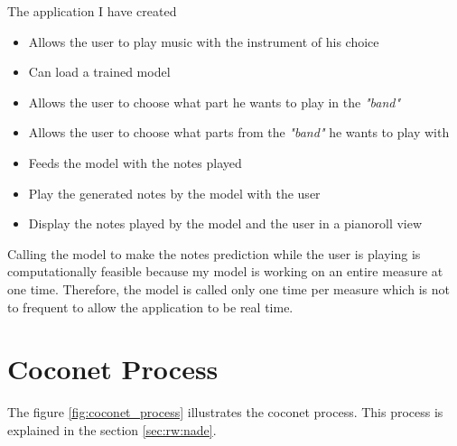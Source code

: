 \documentclass[12pt]{report}
\begin{document}
The application I have created
\begin{itemize}
    \item Allows the user to play music with the instrument of his choice
    \item Can load a trained model
    \item Allows the user to choose what part he wants to play in the \textit{"band"}
    \item Allows the user to choose what parts from the \textit{"band"} he wants to play with
    \item Feeds the model with the notes played 
    \item Play the generated notes by the model with the user
    \item Display the notes played by the model and the user in a pianoroll view
\end{itemize}

Calling the model to make the notes prediction while the user is playing is computationally feasible because my model is working on an entire measure at one time.
Therefore, the model is called only one time per measure which is not to frequent to allow the application to be real time.


\section{Coconet Process}
\label{appendix:coconet_process}

The figure \ref{fig:coconet_process} illustrates the coconet process.
This process is explained in the section \ref{sec:rw:nade}.
\end{document}
